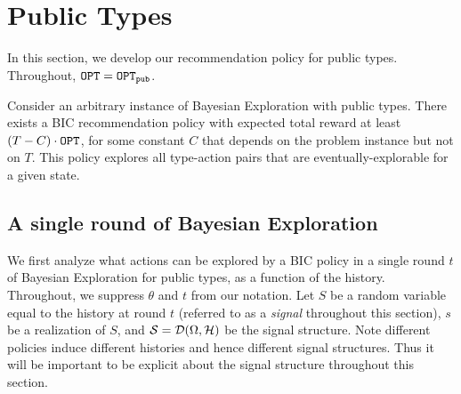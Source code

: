 
\section{Public Types}
\label{sec:public}

In this section, we develop our recommendation policy for public types. Throughout, $\mathtt{OPT} = \mathtt{OPT}_{\mathtt{pub}}$.

\begin{theorem}
\label{thm:public}
Consider an arbitrary instance of Bayesian Exploration with public types.
There exists a BIC recommendation policy with expected total reward at least $\left(T - C \right) \cdot \mathtt{OPT}$, for some constant $C$ that depends on the problem instance but not on $T$. This policy explores all type-action pairs that are eventually-explorable for a given state.
\end{theorem}

\subsection{A single round of Bayesian Exploration}
\label{sec:public_single}

We first analyze what actions can be explored by a BIC policy in a single round $t$ of Bayesian Exploration for public types, as a function of the history. Throughout, we suppress $\theta$ and $t$ from our notation.
Let $S$ be a random variable equal to the history at round $t$ (referred to as a {\em signal} throughout this section), $s$ be a realization of $S$, and $\mathcal{S}=\mathcal{D}(\Omega,\mathcal{H})$ be the signal structure.  Note different policies induce different histories and hence different signal structures.  Thus it will be important to be explicit about the signal structure throughout this section.

%

